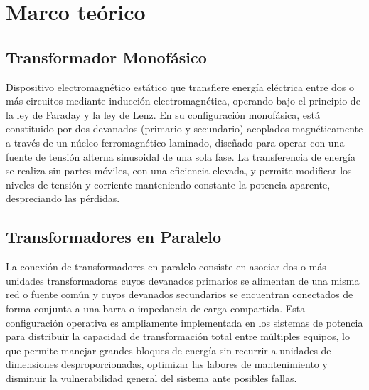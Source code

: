 \section{Marco teórico}


\subsection{Transformador Monofásico}
Dispositivo electromagnético estático que transfiere energía eléctrica entre dos o más circuitos mediante inducción electromagnética, operando bajo el principio de la ley de Faraday y la ley de Lenz. En su configuración monofásica, está constituido por dos devanados (primario y secundario) acoplados magnéticamente a través de un núcleo ferromagnético laminado, diseñado para operar con una fuente de tensión alterna sinusoidal de una sola fase. La transferencia de energía se realiza sin partes móviles, con una eficiencia elevada, y permite modificar los niveles de tensión y corriente manteniendo constante la potencia aparente, despreciando las pérdidas.

\subsection{Transformadores en Paralelo}
La conexión de transformadores en paralelo consiste en asociar dos o más unidades transformadoras cuyos devanados primarios se alimentan de una misma red o fuente común y cuyos devanados secundarios se encuentran conectados de forma conjunta a una barra o impedancia de carga compartida. Esta configuración operativa es ampliamente implementada en los sistemas de potencia para distribuir la capacidad de transformación total entre múltiples equipos, lo que permite manejar grandes bloques de energía sin recurrir a unidades de dimensiones desproporcionadas, optimizar las labores de mantenimiento y disminuir la vulnerabilidad general del sistema ante posibles fallas. 

